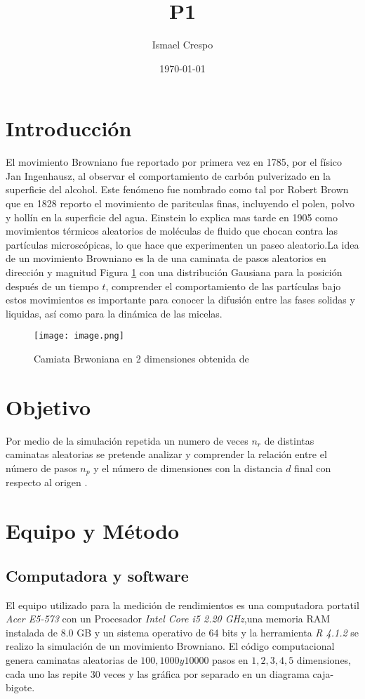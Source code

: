 \documentclass{article}
\title{P1}
\author{Ismael Crespo}
\date{\today}
\begin{document}
\maketitle

\section{Introducción}
El movimiento Browniano fue reportado por primera vez en 1785, por el físico Jan Ingenhausz, al observar el comportamiento de carbón pulverizado en la superficie del alcohol. Este fenómeno fue nombrado como tal por Robert Brown que en 1828 reporto el movimiento de paritculas finas, incluyendo el polen, polvo y hollín en la superficie del agua. Einstein lo explica mas tarde en 1905 como movimientos térmicos aleatorios de moléculas de fluido que chocan contra las partículas microscópicas, lo que hace que experimenten un paseo aleatorio.La idea de un movimiento Browniano es la de una caminata de pasos aleatorios en dirección y magnitud Figura \ref{BM} con una distribución Gausiana para la posición después de un tiempo $t$, comprender el comportamiento de las partículas bajo estos movimientos es importante para conocer la difusión entre las fases solidas y liquidas, así como para la dinámica de las micelas\citep{K.Joseph_et_al_1996}.
\begin{figure}[h] %
    \centering
    \texttt{[image: image.png]} %
    \caption{Camiata Brwoniana en 2 dimensiones obtenida de \citep{K.Joseph_et_al_1996}}
    \label{BM}
\end{figure}
\section{Objetivo}
Por medio de la simulación repetida un numero de veces $n_r$ de distintas caminatas aleatorias se pretende analizar y comprender la relación entre el número de pasos $n_p$ y el número de dimensiones con la distancia $d$ final con respecto al origen .
\section{Equipo y Método}
\subsection{Computadora y software}
El equipo utilizado para la medición de rendimientos es una computadora portatil \emph{Acer E5-573 } con un Procesador \emph{Intel Core i5 2.20 GHz},una memoria RAM instalada de 8.0 GB y un sistema operativo de 64 bits y la herramienta \emph{R 4.1.2} se realizo la simulación de un movimiento Browniano. El código computacional genera caminatas aleatorias de $100,1000 y 10000$ pasos en $1,2,3,4,5$ dimensiones, cada uno las repite $30$ veces y las gráfica por separado en un diagrama caja-bigote. 
\end{document}
